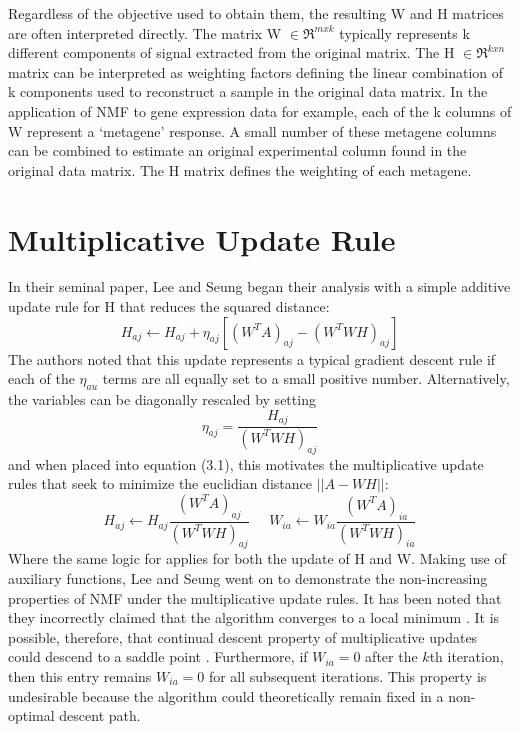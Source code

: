 \documentclass[final,leqno,onefignum,onetabnum]{siamltex1213}
\begin{document}
Regardless of the objective used to obtain them, the resulting W and H matrices are often interpreted directly. The matrix W $ \in \Re^{m x k}$ typically represents k different components of signal extracted from the original matrix. The H $ \in \Re^{k x n}$ matrix can be interpreted as weighting factors defining the linear combination of k components used to reconstruct a sample in the original data matrix. In the application of NMF to gene expression data for example, each of the k columns of W represent a `metagene' response. A small number of these metagene columns can be combined to estimate an original experimental column found in the original data matrix. The H matrix defines the weighting of each metagene. 


\section{Multiplicative Update Rule} In their seminal paper, Lee and Seung began their analysis with a simple additive update rule for H that reduces the squared distance: 
\begin{equation}\label{au1}
 H_{aj} \leftarrow  H_{aj} + \eta_{aj} [ (W^T A)_{aj} - (W^T WH)_{aj}]
\end{equation}
The authors noted that this update represents a typical gradient descent rule if each of the $\eta_{au} $ terms are all equally set to a small positive number. Alternatively, the variables can be diagonally rescaled by setting
\begin{equation}\label{et1}
 \eta_{aj} = \frac{ H_{aj} }{(W^T WH)_{aj}}
\end{equation}
and when placed into equation (3.1), this motivates the multiplicative update rules that seek to minimize the euclidian distance $||A - WH ||$:
\begin{equation}\label{au1}
 H_{aj} \leftarrow  H_{aj} \frac{(W^T A)_{aj} }{ (W^T WH)_{aj} } \; \; \; \; \; W_{ia} \leftarrow  W_{ia} \frac{(W^T A)_{ia} }{ (W^T WH)_{ia} }
\end{equation}
Where the same logic for applies for both the update of H and W. Making use of auxiliary functions, Lee and Seung went on to demonstrate the non-increasing properties of NMF under the multiplicative update rules. It has been noted that they incorrectly claimed that the algorithm converges to a local minimum \cite{Chu, Gon, Lin}. It is possible, therefore, that continual descent property of multiplicative updates could descend to a saddle point \cite{Ber}. Furthermore, if $W_{ia} = 0$ after the $k$th iteration, then this entry remains $W_{ia} = 0$ for all subsequent iterations. This property is undesirable because the algorithm could theoretically remain fixed in a non-optimal descent path. \\
\end{document}
